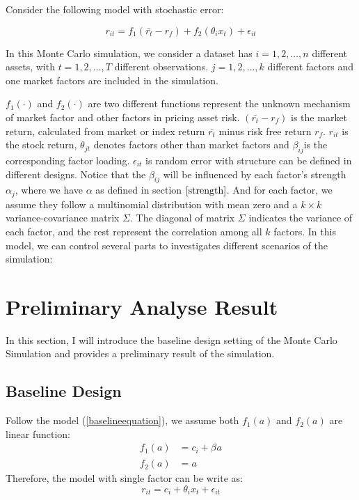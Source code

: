 \documentclass[12pt]{article}
\begin{document}
Consider the following model with stochastic error:

\[  r_{it} = f_1(\bar{r_{t}} - r_f) + f_2( \theta_{i}x_{t}) +\epsilon_{it} \tag{2}\label{baselineequation} \]

In this Monte Carlo simulation, we consider a dataset has $i = 1, 2,\dots, n$ different assets, with $t= 1, 2,\dots, T$ different observations. 
$j = 1, 2, \dots, k$ different factors and one market factors are included in the simulation. 


$f_1(\cdot)$ and $f_2(\cdot)$ are two different functions represent the unknown mechanism of market factor and other factors in pricing asset risk.
$(\bar{r_{t}}- r_f) $ is the market return, calculated from market or index return $\bar{r_{t}}$ minus risk free return $r_f$. 
$r_{it}$ is the stock return, $\theta_{jt}$ denotes factors other than market factors and $\beta_{ij}$is the corresponding factor loading. 
$\epsilon_{it}$ is random error with structure can be defined in different designs.
Notice that the $\beta_{ij}$ will be influenced by each factor's strength $\alpha_j$, where we have $\alpha$ as defined in section $\ref{strength}$. 
And for each factor, we assume they follow a multinomial distribution with mean zero and a $k\times k$ variance-covariance matrix $\Sigma$. 
The diagonal of matrix $\Sigma$ indicates the variance of each factor, and the rest represent the correlation among all $k$ factors.
In this model, we can control several parts to investigates different scenarios of the simulation:

	\section{Preliminary Analyse Result }
	In this section, I will introduce the baseline design setting of the Monte Carlo Simulation and provides a preliminary result of the simulation.
	 \subsection{Baseline Design}\label{base}
	Follow the model (\ref{baselineequation}), we assume both $f_1(a)$ and $f_2(a)$ are linear function:
	 \begin{align*}
	 f_1(a ) &= c_{i} +\beta_{} a\\
	 f_2(a) &=a
	 \end{align*}
	 Therefore, the model with single factor can be write as:
	 \[   r_{it} = c_i +   \theta_{i}x_{t} +\epsilon_{it}   \]
\end{document}

